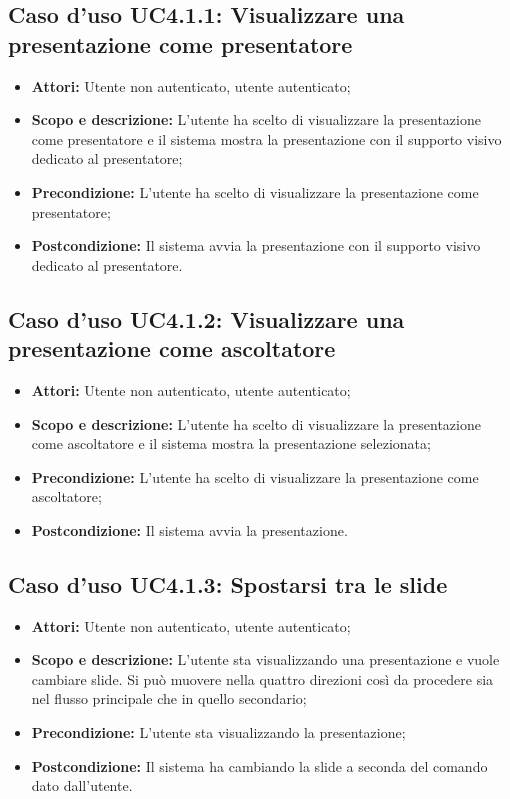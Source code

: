 \subsection{Caso d'uso UC4.1.1: Visualizzare una presentazione come presentatore}
\begin{itemize}
	\item \textbf{Attori:} Utente non autenticato, utente autenticato;
	\item \textbf{Scopo e descrizione:} L'utente ha scelto di visualizzare la presentazione come presentatore e il sistema mostra la presentazione con il supporto visivo dedicato al presentatore;
	\item \textbf{Precondizione:} L'utente ha scelto di visualizzare la presentazione come presentatore;
	\item \textbf{Postcondizione:} Il sistema avvia la presentazione con il supporto visivo dedicato al presentatore.
\end{itemize}

\subsection{Caso d'uso UC4.1.2: Visualizzare una presentazione come ascoltatore}
\begin{itemize}
	\item \textbf{Attori:} Utente non autenticato, utente autenticato;
	\item \textbf{Scopo e descrizione:} L'utente ha scelto di visualizzare la presentazione come ascoltatore e il sistema mostra la presentazione selezionata;
	\item \textbf{Precondizione:} L'utente ha scelto di visualizzare la presentazione come ascoltatore;
	\item \textbf{Postcondizione:} Il sistema avvia la presentazione.
\end{itemize}

\subsection{Caso d'uso UC4.1.3: Spostarsi tra le slide}
\begin{itemize}
	\item \textbf{Attori:} Utente non autenticato, utente autenticato;
	\item \textbf{Scopo e descrizione:} L'utente sta visualizzando una presentazione e vuole cambiare slide. Si può muovere nella quattro direzioni così da procedere sia nel flusso principale che in quello secondario;
	\item \textbf{Precondizione:} L'utente sta visualizzando la presentazione;
	\item \textbf{Postcondizione:} Il sistema ha cambiando la slide a seconda del comando dato dall'utente.
\end{itemize}



